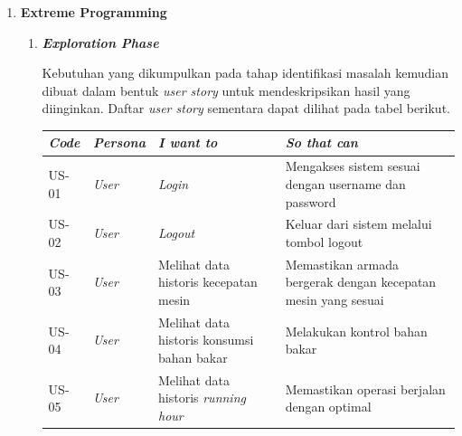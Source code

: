 \begin{enumerate}
\begin{enumerate}[label*=\arabic*.]
        \item \textbf{Extreme Programming}

        \begin{enumerate}[label*=\arabic*.]
            \item \textbf{\textit{Exploration Phase}}

            Kebutuhan yang dikumpulkan pada tahap identifikasi masalah kemudian dibuat dalam bentuk \textit{user story} untuk mendeskripsikan hasil yang diinginkan. Daftar \textit{user story} sementara dapat dilihat pada tabel berikut.

            \begin{longtable}[!h]
                {
                    p{}
                    p{}
                    p{}
                    p{}
                }
                    \toprule
                    \textit{Code} &
                    \textit{Persona} &
                    \textit{I want to} &
                    \textit{So that can} \\ [0.5ex]
                    \midrule

                    US-01 &
                    \textit{User} &
                    \textit{Login} &
                    Mengakses sistem sesuai dengan username dan password
                    \\

                    US-02 &
                    \textit{User} &
                    \textit{Logout} &
                    Keluar dari sistem melalui tombol logout \\

                    US-03 &
                    \textit{User} &
                    Melihat data historis kecepatan mesin &
                    Memastikan armada bergerak dengan kecepatan mesin yang sesuai
                    \\

                    US-04 &
                    \textit{User} &
                    Melihat data historis konsumsi bahan bakar &
                    Melakukan kontrol bahan bakar
                    \\

                    US-05 &
                    \textit{User} &
                    Melihat data historis \textit{running hour} &
                    Memastikan operasi berjalan dengan optimal
                    \\


\end{longtable}
\end{enumerate}
\end{enumerate}
\end{enumerate}
